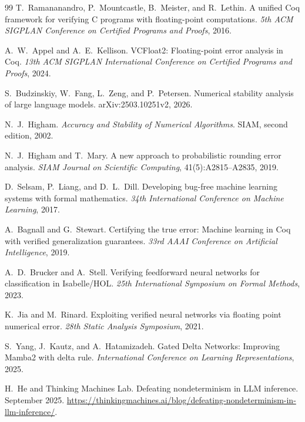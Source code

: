 \documentclass[11pt]{article}
\theoremstyle{plain}
\theoremstyle{definition}
\begin{document}
\begin{thebibliography}{99}
T.~Ramananandro, P.~Mountcastle, B.~Meister, and R.~Lethin.
\newblock A unified Coq framework for verifying C programs with floating-point
  computations.
\newblock \emph{5th ACM SIGPLAN Conference on Certified Programs and Proofs}, 2016.

A.~W.~Appel and A.~E.~Kellison.
\newblock VCFloat2: Floating-point error analysis in Coq.
\newblock \emph{13th ACM SIGPLAN International Conference on Certified Programs
  and Proofs}, 2024.

S.~Budzinskiy, W.~Fang, L.~Zeng, and P.~Petersen.
\newblock Numerical stability analysis of large language models.
\newblock arXiv:2503.10251v2, 2026.

N.~J.~Higham.
\newblock \emph{Accuracy and Stability of Numerical Algorithms}.
\newblock SIAM, second edition, 2002.

N.~J.~Higham and T.~Mary.
\newblock A new approach to probabilistic rounding error analysis.
\newblock \emph{SIAM Journal on Scientific Computing}, 41(5):A2815--A2835, 2019.

D.~Selsam, P.~Liang, and D.~L.~Dill.
\newblock Developing bug-free machine learning systems with formal mathematics.
\newblock \emph{34th International Conference on Machine Learning}, 2017.

A.~Bagnall and G.~Stewart.
\newblock Certifying the true error: Machine learning in Coq with verified
  generalization guarantees.
\newblock \emph{33rd AAAI Conference on Artificial Intelligence}, 2019.

A.~D.~Brucker and A.~Stell.
\newblock Verifying feedforward neural networks for classification in
  Isabelle/HOL.
\newblock \emph{25th International Symposium on Formal Methods}, 2023.

K.~Jia and M.~Rinard.
\newblock Exploiting verified neural networks via floating point numerical
  error.
\newblock \emph{28th Static Analysis Symposium}, 2021.

S.~Yang, J.~Kautz, and A.~Hatamizadeh.
\newblock Gated Delta Networks: Improving Mamba2 with delta rule.
\newblock \emph{International Conference on Learning Representations}, 2025.

H.~He and Thinking Machines Lab.
\newblock Defeating nondeterminism in LLM inference.
\newblock September 2025.
\newblock \url{https://thinkingmachines.ai/blog/defeating-nondeterminism-in-llm-inference/}.


\end{thebibliography}
\end{document}
